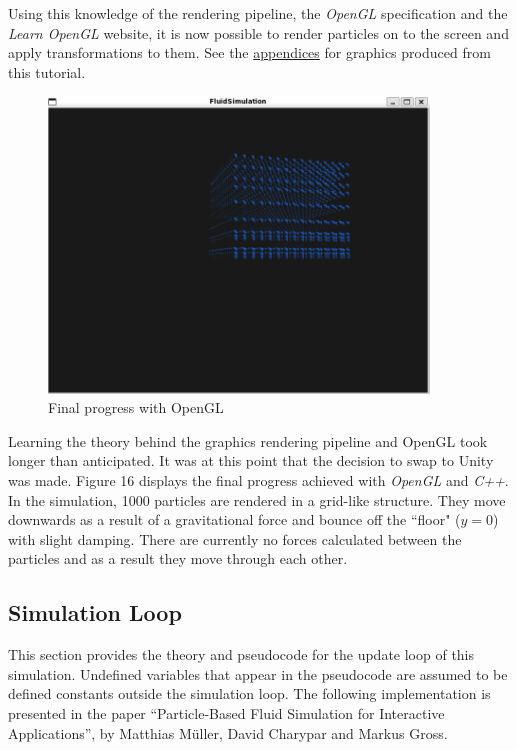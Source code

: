 \documentclass[a4paper, 12pt]{article}
\begin{document}
    Using this knowledge of the rendering pipeline, the \textit{OpenGL} specification and the \textit{Learn OpenGL} website, it is now possible to render particles on to the screen and apply transformations to them. See the \hyperref[sec:appendices]{appendices} for graphics produced from this tutorial. 
    
    \begin{figure}[H]
        \begin{center}
            \includegraphics[width=0.9\textwidth]{openGLProg.png}
            \caption{Final progress with OpenGL}
        \end{center}
    \end{figure}
    
    Learning the theory behind the graphics rendering pipeline and OpenGL took longer than anticipated. It was at this point that the decision to swap to Unity was made. Figure 16 displays the final progress achieved with \textit{OpenGL} and \textit{C++}. In the simulation, 1000 particles are rendered in a grid-like structure. They move downwards as a result of a gravitational force and bounce off the ``floor" ($y = 0$) with slight damping. There are currently no forces calculated between the particles and as a result they move through each other.

    \subsection{Simulation Loop}

    This section provides the theory and pseudocode for the update loop of this simulation. Undefined variables that appear in the pseudocode are assumed to be defined constants outside the simulation loop. The following implementation is presented in the paper ``Particle-Based Fluid Simulation for Interactive Applications'', by Matthias Müller, David Charypar and Markus Gross\cite{sca}.
\end{document}

